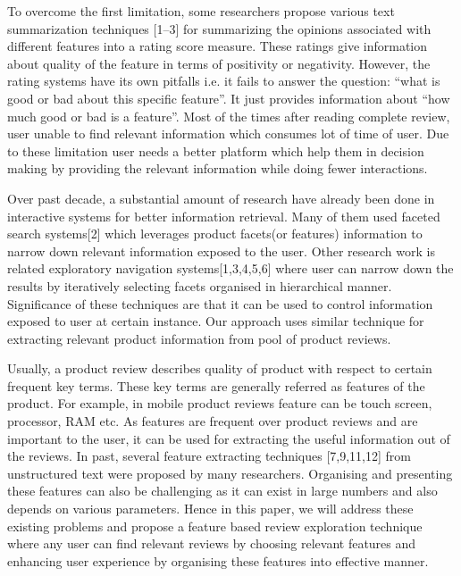 To overcome the first limitation, some researchers propose various text summarization techniques [1–3] for summarizing the opinions associated with different features into a rating score measure. These ratings give information about quality of the feature in terms of positivity or negativity. However, the rating systems have its own pitfalls i.e. it fails to answer the question: “what is good or bad about this specific feature”. It just provides information about “how much good or bad is a feature”.
  Most of the times after reading complete review, user unable to find relevant information which consumes lot of time of user. Due to these limitation user needs a better platform which help them in decision making by providing the relevant information while doing fewer interactions. 

Over past decade, a substantial amount of research have already been done in interactive systems for better information retrieval. Many of them used faceted search systems[2] which leverages product facets(or features) information to narrow down relevant information exposed to the user. Other research work is related exploratory navigation systems[1,3,4,5,6] where user can narrow down the results by iteratively selecting facets organised in hierarchical manner. Significance of these techniques are that it can be used to control information exposed to user at certain instance. Our approach uses similar technique for extracting relevant product information from pool of product reviews.      

Usually, a product review describes quality of product with respect to certain frequent key terms. These key terms are generally referred as features of the product. For example, in mobile product reviews feature can be touch screen, processor, RAM etc. As features are frequent over product reviews and are important to the user, it can be used for extracting the useful information out of the reviews. In past, several feature extracting techniques [7,9,11,12] from unstructured text were proposed by many researchers. Organising and presenting these features can also be challenging as it can exist in large numbers and also depends on various parameters. Hence in this paper, we will address these existing problems and propose a feature based review exploration technique where any user can find relevant reviews by choosing relevant features and enhancing user experience by organising these features into effective manner.